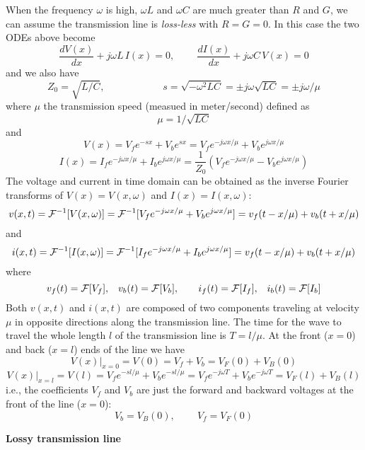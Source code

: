 When the frequency $\omega$ is high, $\omega L$ and $\omega C$ are much
greater than $R$ and $G$, we can assume the transmission line is {\em loss-less} 
with $R=G=0$. In this case the two ODEs above become
\[
\frac{dV(x)}{dx}+j\omega L\,I(x)=0,\;\;\;\;\;\;\;\;\frac{dI(x)}{dx}+j\omega C\,V(x)=0 
\]
and we also have
\[ Z_0 = \sqrt{L/C},\;\;\;\;\;\;\;\;\;\;\;\;\;\;\;\;\;\;\;\;\;
s = \sqrt{-\omega^2 LC}=\pm j\omega\sqrt{LC}=\pm j\omega/\mu  \]
where $\mu$ the transmission speed (measued in meter/second) defined as
\[ \mu=1/\sqrt{LC} \]
and
\[ V(x) = V_f e^{-sx}+V_b e^{sx} = V_f e^{-j\omega x/\mu}+V_b e^{j\omega x/\mu} 
\]
\[ I(x) = I_f e^{-j\omega x/\mu}+I_b e^{j\omega x/\mu}
=\frac{1}{Z_0}\left(V_fe^{-j\omega x/\mu}-V_be^{j\omega x/\mu} \right) \]
The voltage and current in time domain can be obtained as the inverse Fourier
transforms of $V(x)=V(x,\omega)$ and $I(x)=I(x,\omega)$:
\[  v(x,t)={\cal F}^{-1}[V(x,\omega)]={\cal F}^{-1}[V_f e^{-j\omega x/\mu}+V_b e^{j\omega x/\mu}]
=v_f(t-x/\mu)+v_b(t+x/\mu) 
\]
and
\[  i(x,t)={\cal F}^{-1}[I(x,\omega)]={\cal F}^{-1}[I_f e^{-j\omega x/\mu}+I_b e^{j\omega x/\mu}]
  =v_f(t-x/\mu)+v_b(t+x/\mu)
\]
where
\[ v_f(t)={\cal F}[V_f],\;\;\;v_b(t)={\cal F}[V_b],\;\;\;\;\;\;\;
   i_f(t)={\cal F}[I_f],\;\;\;i_b(t)={\cal F}[I_b] \]
Both $v(x,t)$ and $i(x,t)$ are composed of two components traveling at velocity
$\mu$ in opposite directions along the transmission line. The time for the wave
to travel the whole length $l$ of the transmission line is $T=l/\mu$. At the 
front ($x=0$) and back ($x=l$) ends of the line we have
\[ V(x)\big|_{x=0}=V(0)=V_f+V_b=V_F(0)+V_B(0) \]
\[ V(x)\big|_{x=l}=V(l)=V_f e^{-sl/\mu}+V_b e^{-sl/\mu}
=V_f e^{-j\omega T}+V_b e^{-j\omega T}=V_F(l)+V_B(l)
\]
i.e., the coefficients $V_f$ and $V_b$ are just the forward and backward 
voltages at the front of the line ($x=0$):
\[	V_b=V_B(0),\;\;\;\;\;\;\;\;V_f=V_F(0)	\]

{\bf Lossy transmission line}

